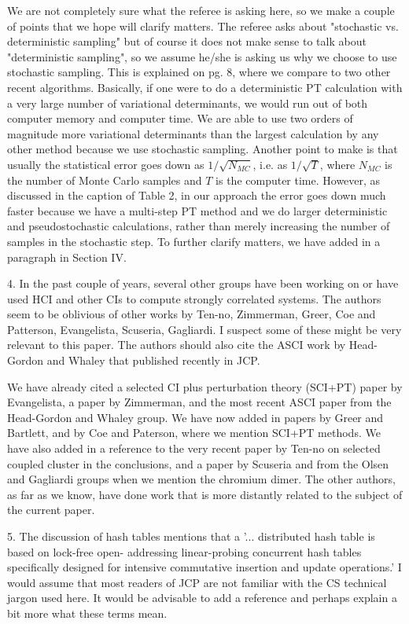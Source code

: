 \documentclass[
preprint,
onecolumn,
 superscriptaddress,
 amsmath,amssymb,
 aps,
]{revtex4-1}
\begin{document}
We are not completely sure what the referee is asking here, so we make a couple of points that
we hope will clarify matters.
The referee asks about "stochastic vs. deterministic sampling" but of course it does not make
sense to talk about "deterministic sampling", so we assume he/she is asking us why we choose to
use stochastic sampling.  This is explained on pg. 8, where we compare to two other
recent algorithms.  Basically, if one were to do a deterministic PT calculation with a very
large number of variational determinants, we would run out of both computer memory and computer time.
We are able to use two orders of magnitude more variational determinants than the largest
calculation by any other method because we use stochastic sampling.
Another point to make is that usually the statistical error goes down as $1/\sqrt{N_{MC}}$, i.e.
as $1/\sqrt{T}$, where $N_{MC}$ is the number of Monte Carlo samples and $T$ is the computer time.
However, as discussed in the caption of Table 2, in our approach the error goes down much faster because
we have a multi-step PT method and we do larger deterministic and pseudostochastic calculations,
rather than merely increasing the number of samples in the stochastic step.
To further clarify matters, we have added in a paragraph in Section IV.


\vskip 5mm {\color{blue}
4. In the past couple of years, several other groups have been working on or have used HCI and
other CIs to compute strongly correlated systems. The authors seem to be oblivious of other
works by Ten-no, Zimmerman, Greer, Coe and Patterson, Evangelista, Scuseria, Gagliardi. I
suspect some of these might be very relevant to this paper. The authors should also cite the
ASCI work by Head-Gordon and Whaley that published recently in JCP.
}\color{black}

We have already cited a selected CI plus perturbation theory (SCI+PT) paper by Evangelista,
a paper by Zimmerman,
and the most recent ASCI paper from the Head-Gordon and Whaley group.
We have now added in papers by Greer and Bartlett, and by Coe and Paterson, where we mention
SCI+PT methods.  We have also added in  a reference to the very recent paper by Ten-no on selected coupled
cluster in the conclusions, and a paper by Scuseria and from the Olsen and Gagliardi groups when we mention the
chromium dimer.
The other authors, as far as we know, have done work that is more distantly related to the subject
of the current paper.

\vskip 5mm {\color{blue}
5. The discussion of hash tables mentions that a '... distributed hash table is based on
lock-free open- addressing linear-probing concurrent hash tables specifically designed for
intensive commutative insertion and update operations.' I would assume that most readers of
JCP are not familiar with the CS technical jargon used here. It would be advisable to add a
reference and perhaps explain a bit more what these terms mean.
}\color{black}
\end{document}
